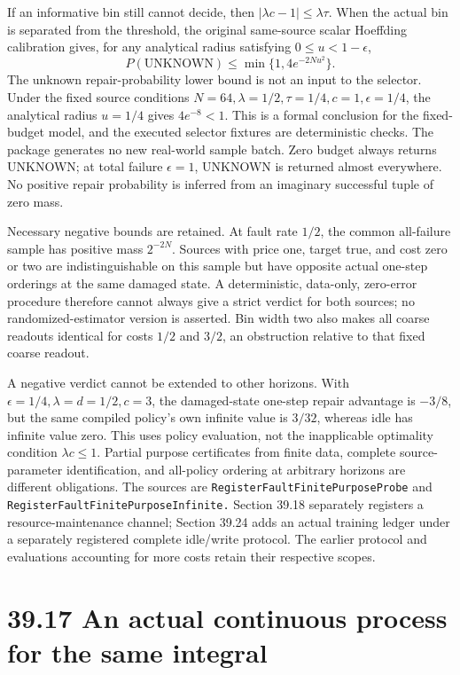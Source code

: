 \documentclass[
  english,
  11pt,
  oneside]{book}
\begin{document}
If an informative bin still cannot decide, then \(|\lambda c-1|\le\lambda\tau\). When the actual bin is separated from the threshold, the original same-source scalar Hoeffding calibration gives, for any analytical radius satisfying \(0\le u<1-\epsilon\), \[P(\mathrm{UNKNOWN})\le\min\{1,4e^{-2Nu^2}\}.\] The unknown repair-probability lower bound is not an input to the selector. Under the fixed source conditions \(N=64,\lambda=1/2,\tau=1/4,c=1,\epsilon=1/4\), the analytical radius \(u=1/4\) gives \(4e^{-8}<1\). This is a formal conclusion for the fixed-budget model, and the executed selector fixtures are deterministic checks. The package generates no new real-world sample batch. Zero budget always returns UNKNOWN; at total failure \(\epsilon=1\), UNKNOWN is returned almost everywhere. No positive repair probability is inferred from an imaginary successful tuple of zero mass.

Necessary negative bounds are retained. At fault rate \(1/2\), the common all-failure sample has positive mass \(2^{-2N}\). Sources with price one, target true, and cost zero or two are indistinguishable on this sample but have opposite actual one-step orderings at the same damaged state. A deterministic, data-only, zero-error procedure therefore cannot always give a strict verdict for both sources; no randomized-estimator version is asserted. Bin width two also makes all coarse readouts identical for costs \(1/2\) and \(3/2\), an obstruction relative to that fixed coarse readout.

A negative verdict cannot be extended to other horizons. With \(\epsilon=1/4,\lambda=d=1/2,c=3\), the damaged-state one-step repair advantage is \(-3/8\), but the same compiled policy's own infinite value is \(3/32\), whereas idle has infinite value zero. This uses policy evaluation, not the inapplicable optimality condition \(\lambda c\le1\). Partial purpose certificates from finite data, complete source-parameter identification, and all-policy ordering at arbitrary horizons are different obligations. The sources are \nolinkurl{RegisterFaultFinitePurposeProbe} and \nolinkurl{RegisterFaultFinitePurposeInfinite.} Section 39.18 separately registers a resource-maintenance channel; Section 39.24 adds an actual training ledger under a separately registered complete idle/write protocol. The earlier protocol and evaluations accounting for more costs retain their respective scopes.

\section{39.17 An actual continuous process for the same integral}\label{an-actual-continuous-process-for-the-same-integral}
\end{document}
